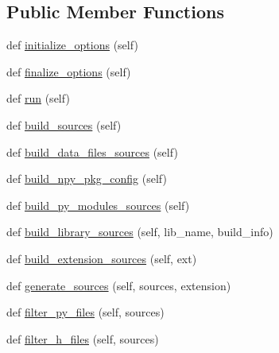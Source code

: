 \subsection*{Public Member Functions}
\begin{DoxyCompactItemize}
\item 
def \hyperlink{classnumpy_1_1distutils_1_1command_1_1build__src_1_1build__src_a3418239764d4b4d7724dbdc91c311e79}{initialize\+\_\+options} (self)
\item 
def \hyperlink{classnumpy_1_1distutils_1_1command_1_1build__src_1_1build__src_a287e174bccf5b6ed91fa8f5f4cdc2d6a}{finalize\+\_\+options} (self)
\item 
def \hyperlink{classnumpy_1_1distutils_1_1command_1_1build__src_1_1build__src_abcae764d374882f5ca515b1fa267fe90}{run} (self)
\item 
def \hyperlink{classnumpy_1_1distutils_1_1command_1_1build__src_1_1build__src_adb92f7aa4bf95976041b7a1e8d452a23}{build\+\_\+sources} (self)
\item 
def \hyperlink{classnumpy_1_1distutils_1_1command_1_1build__src_1_1build__src_a77e5fc7595e45ab8e85d1ef001c1bbcc}{build\+\_\+data\+\_\+files\+\_\+sources} (self)
\item 
def \hyperlink{classnumpy_1_1distutils_1_1command_1_1build__src_1_1build__src_a27abd88594659737e31b380015325f3b}{build\+\_\+npy\+\_\+pkg\+\_\+config} (self)
\item 
def \hyperlink{classnumpy_1_1distutils_1_1command_1_1build__src_1_1build__src_a83d9c9f5b567781c930bda27852d68bc}{build\+\_\+py\+\_\+modules\+\_\+sources} (self)
\item 
def \hyperlink{classnumpy_1_1distutils_1_1command_1_1build__src_1_1build__src_ae0358cdb152ae4edad50651d75155ac8}{build\+\_\+library\+\_\+sources} (self, lib\+\_\+name, build\+\_\+info)
\item 
def \hyperlink{classnumpy_1_1distutils_1_1command_1_1build__src_1_1build__src_abb182fd4f5c65e6ee965c7539ecb2f8b}{build\+\_\+extension\+\_\+sources} (self, ext)
\item 
def \hyperlink{classnumpy_1_1distutils_1_1command_1_1build__src_1_1build__src_ab14e5654c94036220d35310a4c8e9d91}{generate\+\_\+sources} (self, sources, extension)
\item 
def \hyperlink{classnumpy_1_1distutils_1_1command_1_1build__src_1_1build__src_a71c230d7fd10ef9c38bbedbc26cc140b}{filter\+\_\+py\+\_\+files} (self, sources)
\item 
def \hyperlink{classnumpy_1_1distutils_1_1command_1_1build__src_1_1build__src_a544deadb264c534ad7a1e35ab4f862be}{filter\+\_\+h\+\_\+files} (self, sources)

\end{DoxyCompactItemize}
